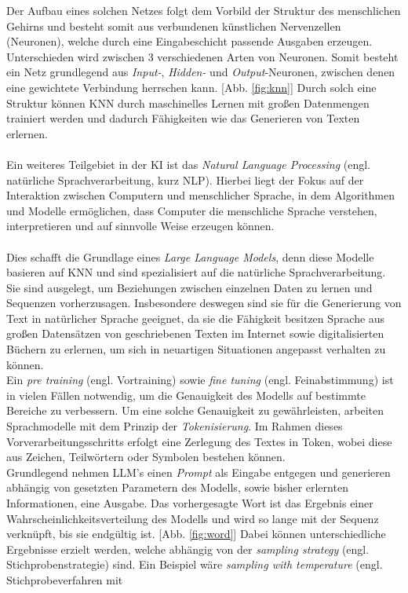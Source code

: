Der Aufbau eines solchen Netzes folgt dem Vorbild der Struktur des menschlichen Gehirns und besteht somit aus verbundenen künstlichen Nervenzellen (Neuronen), welche durch eine Eingabeschicht passende Ausgaben erzeugen. \cite*{morrKuenstlicheNeuronaleNetze} Unterschieden wird zwischen 3 verschiedenen Arten von Neuronen. Somit besteht ein Netz grundlegend aus \textit{Input-}, \textit{Hidden-} und \textit{Output}-Neuronen, zwischen denen eine gewichtete Verbindung herrschen kann. \cite*{NeuronaleNetzeEinfuhrung} [Abb. \ref{fig:knn}] Durch solch eine Struktur können KNN durch maschinelles Lernen mit großen Datenmengen trainiert werden und dadurch Fähigkeiten wie das Generieren von Texten erlernen. \cite*{seemannKuenstlicheIntelligenzLarge}\\\\ Ein weiteres Teilgebiet in der KI ist das \textit{Natural Language Processing} (engl. natürliche Sprachverarbeitung, kurz NLP). Hierbei liegt der Fokus auf der Interaktion zwischen Computern und menschlicher Sprache, in dem Algorithmen und Modelle ermöglichen, dass Computer die menschliche Sprache verstehen, interpretieren und auf sinnvolle Weise erzeugen können. \cite*{muruganNaturalLanguageProcessing2024} \\\\ Dies schafft die Grundlage eines \textit{Large Language Models}, denn diese Modelle basieren auf KNN und sind spezialisiert auf die natürliche Sprachverarbeitung. \cite*{seemannKuenstlicheIntelligenzLarge} Sie sind ausgelegt, um Beziehungen zwischen einzelnen Daten zu lernen und Sequenzen vorherzusagen. Insbesondere deswegen sind sie für die Generierung von Text in natürlicher Sprache geeignet, da sie die Fähigkeit besitzen Sprache aus großen Datensätzen von geschriebenen Texten im Internet sowie digitalisierten Büchern zu erlernen, um sich in neuartigen Situationen angepasst verhalten zu können. \cite*{okerlundWhatChatterbox2022} \cite*{authorityofthehouseoflordsLargeLanguageModels} \\Ein \textit{pre training} (engl. Vortraining) sowie \textit{fine tuning} (engl. Feinabstimmung) ist in vielen Fällen notwendig, um die Genauigkeit des Modells auf bestimmte Bereiche zu verbessern. \cite{HowLLMsWork} Um eine solche Genauigkeit zu gewährleisten, arbeiten Sprachmodelle mit dem Prinzip der \textit{Tokenisierung}. Im Rahmen dieses Vorverarbeitungsschritts erfolgt eine Zerlegung des Textes in Token, wobei diese aus Zeichen, Teilwörtern oder Symbolen bestehen können. \cite*{naveedComprehensiveOverviewLarge2024} \\ Grundlegend nehmen LLM's einen \textit{Prompt} als Eingabe entgegen und generieren abhängig von gesetzten Parametern des Modells, sowie bisher erlernten Informationen, eine Ausgabe. Das vorhergesagte Wort ist das Ergebnis einer Wahrscheinlichkeitsverteilung des Modells und wird so lange mit der Sequenz verknüpft, bis sie endgültig ist. [Abb. \ref{fig:word}] Dabei können unterschiedliche Ergebnisse erzielt werden, welche abhängig von der \textit{sampling strategy} (engl. Stichprobenstrategie) sind. \cite*{cholletDeepLearningPython2018} Ein Beispiel wäre \textit{sampling with temperature} (engl. Stichprobeverfahren mit 